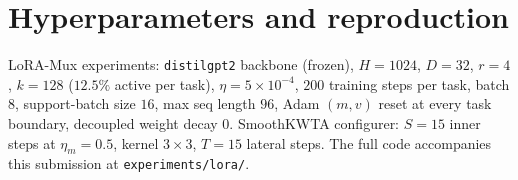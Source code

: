 \documentclass{article}
\theoremstyle{plain}
\theoremstyle{remark}
\begin{document}
\section{Hyperparameters and reproduction}
\label{app:hp}
LoRA-Mux experiments: \texttt{distilgpt2} backbone (frozen), $H=1024$, $D=32$, $r=4$, $k=128$ ($12.5\%$ active per task), $\eta=5\times 10^{-4}$, $200$ training steps per task, batch $8$, support-batch size $16$, max seq length $96$, Adam $(m,v)$ reset at every task boundary, decoupled weight decay $0$. SmoothKWTA configurer: $S=15$ inner steps at $\eta_m=0.5$, kernel $3\times 3$, $T=15$ lateral steps. The full code accompanies this submission at \texttt{experiments/lora/}.
\end{document}
